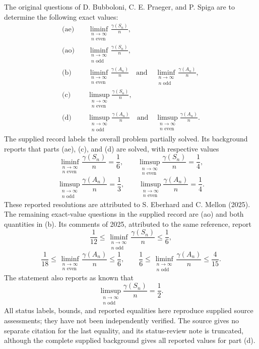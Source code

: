 \documentclass[11pt]{article}
\begin{document}
The original questions of D. Bubboloni, C. E. Praeger, and P. Spiga are to determine the following exact values:
\begin{align*}
\text{(ae)}\quad&\liminf_{\substack{n\to\infty\\n\text{ even}}}\frac{\gamma(S_n)}{n},\\
\text{(ao)}\quad&\liminf_{\substack{n\to\infty\\n\text{ odd}}}\frac{\gamma(S_n)}{n},\\
\text{(b)}\quad&\liminf_{\substack{n\to\infty\\n\text{ even}}}\frac{\gamma(A_n)}{n}\quad\text{and}\quad\liminf_{\substack{n\to\infty\\n\text{ odd}}}\frac{\gamma(A_n)}{n},\\
\text{(c)}\quad&\limsup_{\substack{n\to\infty\\n\text{ even}}}\frac{\gamma(S_n)}{n},\\
\text{(d)}\quad&\limsup_{\substack{n\to\infty\\n\text{ odd}}}\frac{\gamma(A_n)}{n}\quad\text{and}\quad\limsup_{\substack{n\to\infty\\n\text{ even}}}\frac{\gamma(A_n)}{n}.
\end{align*}
The supplied record labels the overall problem partially solved. Its background reports that parts (ae), (c), and (d) are solved, with respective values
\[
\liminf_{\substack{n\to\infty\\n\text{ even}}}\frac{\gamma(S_n)}n=\frac16,
\qquad
\limsup_{\substack{n\to\infty\\n\text{ even}}}\frac{\gamma(S_n)}n=\frac14,
\]
\[
\limsup_{\substack{n\to\infty\\n\text{ odd}}}\frac{\gamma(A_n)}n=\frac13,
\qquad
\limsup_{\substack{n\to\infty\\n\text{ even}}}\frac{\gamma(A_n)}n=\frac14.
\]
These reported resolutions are attributed to S. Eberhard and C. Mellon (2025). The remaining exact-value questions in the supplied record are (ao) and both quantities in (b). Its comments of 2025, attributed to the same reference, report
\[
\frac1{12}\leq\liminf_{\substack{n\to\infty\\n\text{ odd}}}\frac{\gamma(S_n)}n\leq\frac16,
\]
\[
\frac1{18}\leq\liminf_{\substack{n\to\infty\\n\text{ even}}}\frac{\gamma(A_n)}n\leq\frac16,
\qquad
\frac16\leq\liminf_{\substack{n\to\infty\\n\text{ odd}}}\frac{\gamma(A_n)}n\leq\frac4{15}.
\]
The statement also reports as known that
\[
\limsup_{\substack{n\to\infty\\n\text{ odd}}}\frac{\gamma(S_n)}n=\frac12.
\]
All status labels, bounds, and reported equalities here reproduce supplied source assessments; they have not been independently verified. The source gives no separate citation for the last equality, and its status-review note is truncated, although the complete supplied background gives all reported values for part (d).
\end{document}
